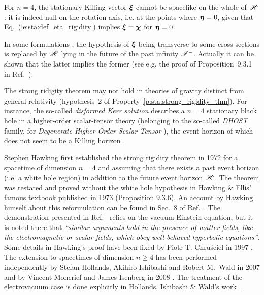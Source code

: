 \begin{remark}
For $n=4$, the stationary Killing vector $\bm{\xi}$ cannot be spacelike
on the whole of $\mathscr{H}$: it is indeed null on the rotation axis, i.e.
at the points where $\bm{\eta} = 0$, given that Eq.~(\ref{e:sta:def_eta_rigidity})
implies $\bm{\xi} = \bm{\chi}$ for $\bm{\eta}=0$.
\end{remark}

\begin{remark}
In some formulations \cite{HollaIW07,HawkiE73}, the hypothesis of $\bm{\xi}$
being transverse to some cross-sections is replaced by $\mathscr{H}$ lying in
the future of the past infinity $\mathscr{I}^-$. Actually it can be shown
that the latter implies the former (see e.g. the proof of Proposition~9.3.1
in Ref.~\cite{HawkiE73}).
\end{remark}

\begin{remark}
The strong ridigity theorem may not hold in theories of gravity distinct
from general relativity (hypothesis~2 of Property~\ref{p:sta:strong_rigidity_thm}).
For instance, the so-called \emph{disformed Kerr solution}
\cite{AnsonBCH21,BenAc_al20}
describes a $n=4$ stationary black hole in a higher-order scalar-tensor theory (belonging to the
so-called \emph{DHOST} family, for \emph{Degenerate Higher-Order Scalar-Tensor} \cite{Langl19}), the event horizon of which does not seem to be a Killing horizon
\cite{AnsonBCH21}.
\end{remark}


\begin{hist}
Stephen Hawking first established the strong rigidity
theorem in 1972 \cite{Hawki72}
for a spacetime of dimension $n=4$ and assuming that there exists
a past event horizon (i.e. a white hole region) in addition to the
future event horizon $\mathscr{H}$.
The theorem was restated and proved without the white hole hypothesis
in Hawking \& Ellis' famous textbook published in 1973 \cite{HawkiE73}
(Proposition 9.3.6).
An account by Hawking himself
about this reformulation can be found in
Sec.~8 of Ref.~\cite{Hawki73}. The demonstration presented in Ref.~\cite{HawkiE73}
relies on the vacuum Einstein equation,
but it is noted there that \emph{``similar arguments hold in the presence
of matter fields, like the electromagnetic or scalar fields, which obey
well-behaved hyperbolic equations''}.
Some details in Hawking's proof have been fixed
by Piotr T. Chru\'sciel in 1997 \cite{Chrus97}.
The extension to spacetimes of
dimension $n\geq 4$ has been performed independently by
Stefan Hollands, Akihiro Ishibashi
and Robert M.~Wald in 2007 \cite{HollaIW07}
and by Vincent Moncrief and James Isenberg
in 2008 \cite{MoncrI08}. The treatment of the electrovacuum
case is done explicitly in Hollands, Ishibashi \& Wald's work \cite{HollaIW07}.
\end{hist}

